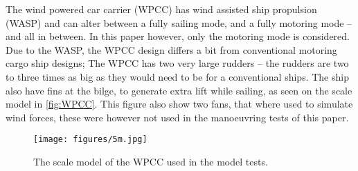 The wind powered car carrier (WPCC) has wind assisted ship propulsion (WASP) and can alter between a fully sailing mode, and a fully motoring mode -- and all in between. 
In this paper however, only the motoring mode is considered. Due to the WASP, the WPCC design differs a bit from conventional motoring cargo ship designs; The WPCC has two very large rudders -- the rudders are two to three times as big as they would need to be for a conventional ships. The ship also have fins at the bilge, to generate extra lift while sailing, as seen on the scale model in \autoref{fig:WPCC}. This figure also show two fans, that where used to simulate wind forces, these were however not used in the manoeuvring tests of this paper.
\begin{figure}[h]
    \centering
    \texttt{[image: figures/5m.jpg]}
    \caption{The scale model of the WPCC used in the model tests.}
    \label{fig:WPCC}
\end{figure}